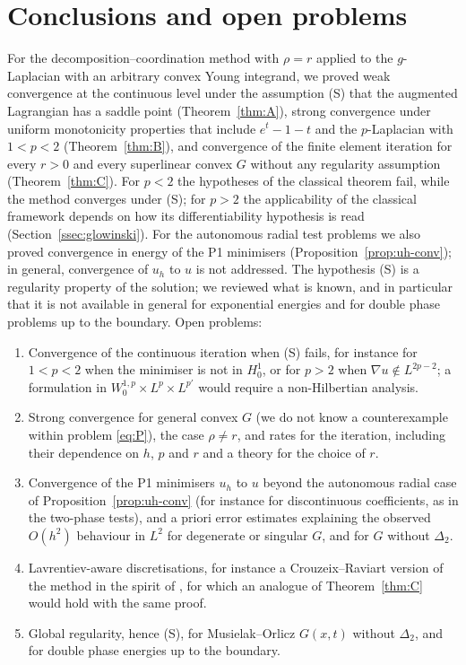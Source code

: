 \documentclass[11pt]{amsart}
\theoremstyle{definition}
\theoremstyle{remark}
\numberwithin{equation}{section}
\begin{document}
\section{Conclusions and open problems}\label{sec:conclusions}
For the decomposition--coordination method with $\rho=r$ applied to the $g$-Laplacian with an arbitrary convex Young integrand, we proved weak convergence at the continuous level under the assumption (S) that the augmented Lagrangian has a saddle point (Theorem~\ref{thm:A}), strong convergence under uniform monotonicity properties that include $e^t-1-t$ and the $p$-Laplacian with $1<p<2$ (Theorem~\ref{thm:B}), and convergence of the finite element iteration for every $r>0$ and every superlinear convex $G$ without any regularity assumption (Theorem~\ref{thm:C}). For $p<2$ the hypotheses of the classical theorem fail, while the method converges under (S); for $p>2$ the applicability of the classical framework depends on how its differentiability hypothesis is read (Section~\ref{ssec:glowinski}). For the autonomous radial test problems we also proved convergence in energy of the P1 minimisers (Proposition~\ref{prop:uh-conv}); in general, convergence of $u_h$ to $u$ is not addressed. The hypothesis (S) is a regularity property of the solution; we reviewed what is known, and in particular that it is not available in general for exponential energies and for double phase problems up to the boundary. Open problems:
\begin{enumerate}[label=(\arabic*),leftmargin=2em]
\item Convergence of the continuous iteration when (S) fails, for instance for $1<p<2$ when the minimiser is not in $H^1_0$, or for $p>2$ when $\nabla u\notin L^{2p-2}$; a formulation in $W^{1,p}_0\times L^p\times L^{p'}$ would require a non-Hilbertian analysis.
\item Strong convergence for general convex $G$ (we do not know a counterexample within problem \eqref{eq:P}), the case $\rho\ne r$, and rates for the iteration, including their dependence on $h$, $p$ and $r$ and a theory for the choice of $r$.
\item Convergence of the P1 minimisers $u_h$ to $u$ beyond the autonomous radial case of Proposition~\ref{prop:uh-conv} (for instance for discontinuous coefficients, as in the two-phase tests), and a priori error estimates explaining the observed $O(h^2)$ behaviour in $L^2$ for degenerate or singular $G$, and for $G$ without $\Delta_2$.
\item Lavrentiev-aware discretisations, for instance a Crouzeix--Raviart version of the method in the spirit of \cite{BalciOrtnerStorn2022}, for which an analogue of Theorem~\ref{thm:C} would hold with the same proof.
\item Global regularity, hence (S), for Musielak--Orlicz $G(x,t)$ without $\Delta_2$, and for double phase energies up to the boundary.
\end{enumerate}
\end{document}
